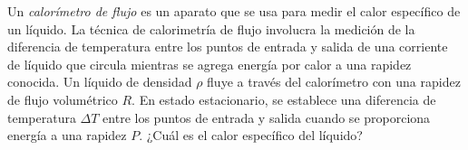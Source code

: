 \item Un \textit{calorímetro de flujo} es un aparato que se usa para medir el calor específico de un líquido. La técnica de calorimetría de flujo involucra la medición de la diferencia de temperatura entre los puntos de entrada y salida de una corriente de líquido que circula mientras se agrega energía por calor a una rapidez conocida. Un líquido de densidad $\rho$ fluye a través del calorímetro con una rapidez de flujo volumétrico $R$. En estado estacionario, se establece una diferencia de temperatura $\Delta T$ entre los puntos de entrada y salida cuando se proporciona energía a una rapidez $P$. ¿Cuál es el calor específico del líquido?
